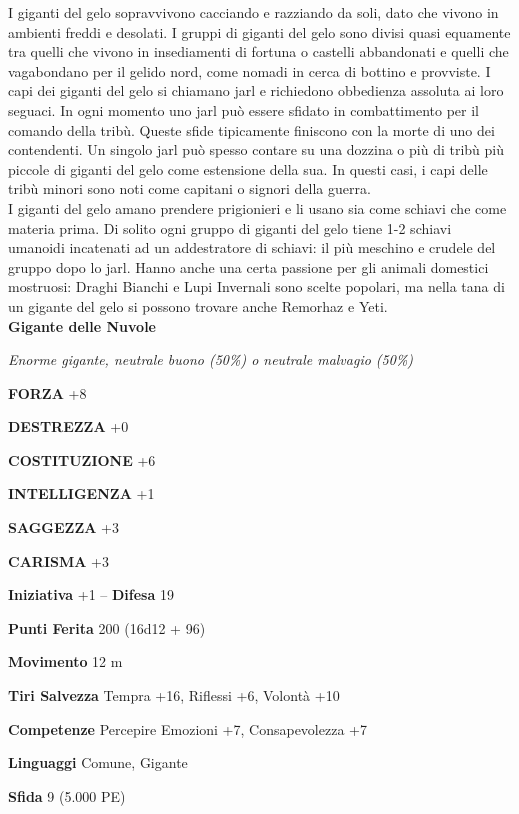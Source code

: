 \begin{multicols}{2}
I giganti del gelo sopravvivono cacciando e razziando da soli, dato che vivono in ambienti freddi e desolati. I gruppi di giganti del gelo sono divisi quasi equamente tra quelli che vivono in insediamenti di fortuna o castelli abbandonati e quelli che vagabondano per il gelido nord, come nomadi in cerca di bottino e provviste. I capi dei giganti del gelo si chiamano jarl e richiedono obbedienza assoluta ai loro seguaci. In ogni momento uno jarl può essere sfidato in combattimento per il comando della tribù. Queste sfide tipicamente finiscono con la morte di uno dei contendenti. Un singolo jarl può spesso contare su una dozzina o più di tribù più piccole di giganti del gelo come estensione della sua. In questi casi, i capi delle tribù minori sono noti come capitani o signori della guerra.\\

I giganti del gelo amano prendere prigionieri e li usano sia come schiavi che come materia prima. Di solito ogni gruppo di giganti del gelo tiene 1-2 schiavi umanoidi incatenati ad un addestratore di schiavi: il più meschino e crudele del gruppo dopo lo jarl. Hanno anche una certa passione per gli animali domestici mostruosi: Draghi Bianchi e Lupi Invernali sono scelte popolari, ma nella tana di un gigante del gelo si possono trovare anche Remorhaz e Yeti.\\



\medskip{}\textbf{Gigante delle Nuvole}

\emph{Enorme gigante, neutrale buono (50\%) o neutrale malvagio (50\%)}

\textbf{FORZA} +8

\textbf{DESTREZZA} +0

\textbf{COSTITUZIONE} +6

\textbf{INTELLIGENZA} +1

\textbf{SAGGEZZA} +3

\textbf{CARISMA} +3

\textbf{Iniziativa} +1 -- \textbf{Difesa} 19

\textbf{Punti Ferita} 200 (16d12 + 96)

\textbf{Movimento} 12 m

\textbf{Tiri Salvezza} Tempra +16, Riflessi +6, Volontà +10

\textbf{Competenze} Percepire Emozioni +7, Consapevolezza +7

\textbf{Linguaggi} Comune, Gigante

\textbf{Sfida} 9 (5.000 PE)


\end{multicols}
